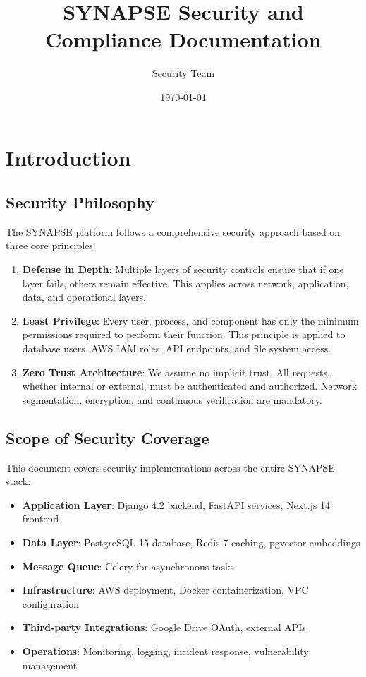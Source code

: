 \documentclass{report}
\title{SYNAPSE Security and Compliance Documentation}
\author{Security Team}
\date{\today}
\begin{document}
\maketitle

\tableofcontents

\chapter{Introduction}

\section{Security Philosophy}

The SYNAPSE platform follows a comprehensive security approach based on three core principles:

\begin{enumerate}
\item \textbf{Defense in Depth}: Multiple layers of security controls ensure that if one layer fails, others remain effective. This applies across network, application, data, and operational layers.

\item \textbf{Least Privilege}: Every user, process, and component has only the minimum permissions required to perform their function. This principle is applied to database users, AWS IAM roles, API endpoints, and file system access.

\item \textbf{Zero Trust Architecture}: We assume no implicit trust. All requests, whether internal or external, must be authenticated and authorized. Network segmentation, encryption, and continuous verification are mandatory.
\end{enumerate}

\section{Scope of Security Coverage}

This document covers security implementations across the entire SYNAPSE stack:

\begin{itemize}
\item \textbf{Application Layer}: Django 4.2 backend, FastAPI services, Next.js 14 frontend
\item \textbf{Data Layer}: PostgreSQL 15 database, Redis 7 caching, pgvector embeddings
\item \textbf{Message Queue}: Celery for asynchronous tasks
\item \textbf{Infrastructure}: AWS deployment, Docker containerization, VPC configuration
\item \textbf{Third-party Integrations}: Google Drive OAuth, external APIs
\item \textbf{Operations}: Monitoring, logging, incident response, vulnerability management
\end{itemize}
\end{document}
